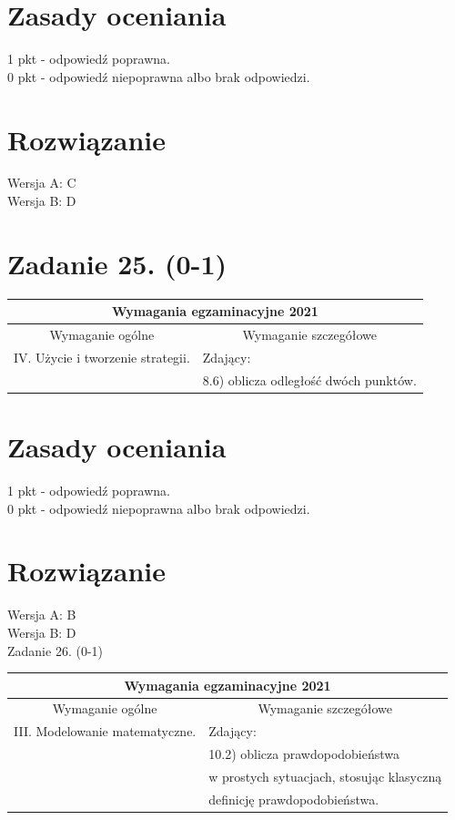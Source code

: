 \documentclass[10pt]{article}
\begin{document}
\section*{Zasady oceniania}
1 pkt - odpowiedź poprawna.\\
0 pkt - odpowiedź niepoprawna albo brak odpowiedzi.

\section*{Rozwiązanie}
Wersja A: C\\
Wersja B: D

\section*{Zadanie 25. (0-1)}
\begin{center}
\begin{tabular}{|l|l|}
\hline
\multicolumn{2}{|c|}{Wymagania egzaminacyjne 2021} \\
\hline
\multicolumn{1}{|c|}{Wymaganie ogólne} & \multicolumn{1}{c|}{Wymaganie szczegółowe} \\
\hline
IV. Użycie i tworzenie strategii. & Zdający: \\
 & 8.6) oblicza odległość dwóch punktów. \\
\hline
\end{tabular}
\end{center}

\section*{Zasady oceniania}
1 pkt - odpowiedź poprawna.\\
0 pkt - odpowiedź niepoprawna albo brak odpowiedzi.

\section*{Rozwiązanie}
Wersja A: B\\
Wersja B: D\\
Zadanie 26. (0-1)

\begin{center}
\begin{tabular}{|l|l|}
\hline
\multicolumn{2}{|c|}{Wymagania egzaminacyjne 2021} \\
\hline
\multicolumn{1}{|c|}{Wymaganie ogólne} & \multicolumn{1}{|c|}{Wymaganie szczegółowe} \\
\hline
III. Modelowanie matematyczne. & Zdający: \\
 & 10.2) oblicza prawdopodobieństwa \\
 & w prostych sytuacjach, stosując klasyczną \\
 & definicję prawdopodobieństwa. \\
\hline
\end{tabular}
\end{center}
\end{document}
